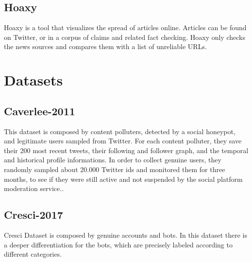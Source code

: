 \subsection{Hoaxy}
Hoaxy is a tool that visualizes the spread of articles online. Articles can be found on Twitter, or in a corpus of claims and related fact checking. 
Hoaxy only checks the news sources and compares them with a list of unreliable URLs.

\section{Datasets}

\subsection{Caverlee-2011}
This dataset is composed by content polluters, detected by a social honeypot, and legitimate users sampled from Twitter.
For each content polluter, they save their 200 most recent tweets, their following and follower graph, and the temporal and historical profile informations.
In order to collect genuine users, they randomly sampled about 20.000 Twitter ids and monitored them for three months, to see if they were still active and not suspended by the social platform moderation service.\cite{Lee11sevenmonths}.


\subsection{Cresci-2017}
Cresci Dataset is composed by genuine accounts and bots. In this dataset there is a deeper differentiation for the bots, which are precisely labeled according to different categories.

